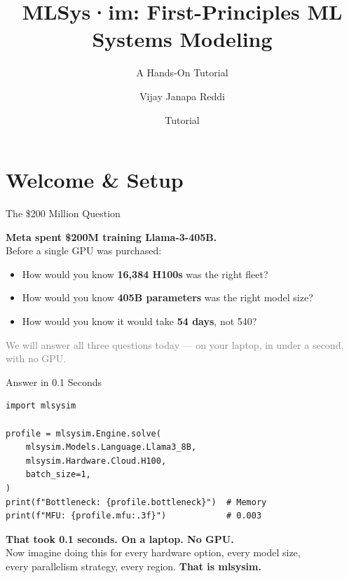 \documentclass[aspectratio=169, 12pt]{beamer}
\title{MLSys·im: First-Principles ML Systems Modeling}
\subtitle{A Hands-On Tutorial}
\author{Vijay Janapa Reddi}
\institute{Harvard University}
\date{Tutorial}
\begin{document}
\section{Welcome \& Setup}

\begin{frame}
\titlepage
\end{frame}

\begin{frame}{The \$200 Million Question}

\centering
\Large
\textbf{Meta spent \$200M training Llama-3-405B.}\\[1cm]

\normalsize
Before a single GPU was purchased:\\[0.3cm]
\begin{itemize}
  \item How would you know \textbf{16,384 H100s} was the right fleet?
  \item How would you know \textbf{405B parameters} was the right model size?
  \item How would you know it would take \textbf{54 days}, not 540?
\end{itemize}

\vfill
\small\textcolor{gray}{We will answer all three questions today --- on your laptop, in under a second, with no GPU.}
\end{frame}

\begin{frame}[fragile]{Answer in 0.1 Seconds}

\begin{lstlisting}
import mlsysim

profile = mlsysim.Engine.solve(
    mlsysim.Models.Language.Llama3_8B,
    mlsysim.Hardware.Cloud.H100,
    batch_size=1,
)
print(f"Bottleneck: {profile.bottleneck}")  # Memory
print(f"MFU: {profile.mfu:.3f}")            # 0.003
\end{lstlisting}

\vfill
\centering
\textbf{That took 0.1 seconds. On a laptop. No GPU.}\\[0.2cm]
\small Now imagine doing this for every hardware option, every model size,\\
every parallelism strategy, every region. \textbf{That is mlsysim.}
\end{frame}
\end{document}
